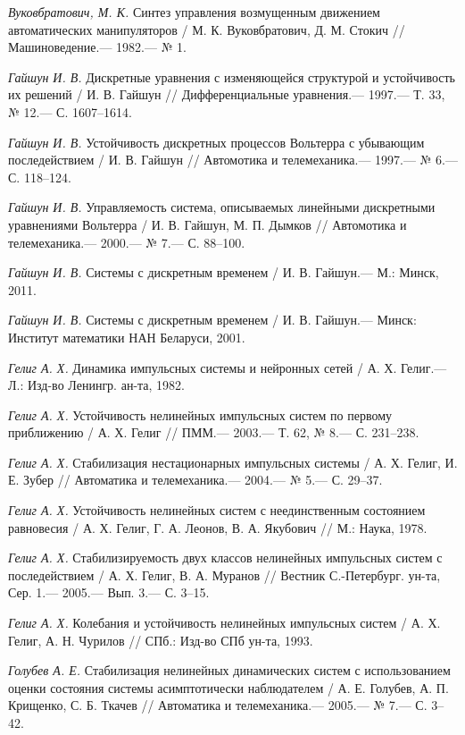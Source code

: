 \begin{thebibliography}{10}
	{\it Вуковбратович, М. К.} Синтез управления возмущенным движением автоматических манипуляторов /
	М. К. Вуковбратович, Д. М. Стокич // Машиноведение.— 1982.— № 1.
	
	{\it Гайшун И. В.} Дискретные уравнения с изменяющейся структурой и устойчивость их решений /
	И. В. Гайшун // Дифференциальные уравнения.— 1997.— Т. 33, № 12.— С. 1607–1614.
	
	{\it Гайшун И. В.} Устойчивость дискретных процессов Вольтерра с убывающим последействием /
	И. В. Гайшун // Автомотика и телемеханика.— 1997.— № 6.— С. 118–124.
	
	{\it Гайшун И. В.} Управляемость система, описываемых линейными дискретными уравнениями Вольтерра /
	И. В. Гайшун, М. П. Дымков // Автомотика и телемеханика.— 2000.— № 7.— С. 88–100.
	
	{\it Гайшун И. В.} Системы с дискретным временем /
	И. В. Гайшун.— М.: Минск, 2011.
	
	
	{\it Гайшун И. В.} Системы с дискретным временем /
	И. В. Гайшун.— Минск: Институт математики НАН Беларуси, 2001.
	
	{\it Гелиг А. Х.} Динамика импульсных системы и нейронных сетей /
	А. Х. Гелиг.— Л.: Изд-во Ленингр. ан-та, 1982.
	
	{\it Гелиг А. Х.} Устойчивость нелинейных импульсных систем по первому приближению /
	А. Х. Гелиг // ПММ.— 2003.— Т. 62, № 8.— С. 231–238.
	
	{\it Гелиг А. Х.} Стабилизация нестационарных импульсных системы /
	А. Х. Гелиг, И. Е. Зубер // Автоматика и телемеханика.— 2004.— № 5.— С. 29–37.
	
	{\it Гелиг А. Х.} Устойчивость нелинейных систем с неединственным состоянием равновесия /
	А. Х. Гелиг, Г. А. Леонов, В. А. Якубович // М.: Наука, 1978.
	
	{\it Гелиг А. Х.} Стабилизируемость двух классов нелинейных импульсных систем с последействием /
	А. Х. Гелиг, В. А. Муранов // Вестник С.-Петербург. ун-та, Сер. 1.— 2005.— Вып. 3.— С. 3–15.
	
	{\it Гелиг А. Х.} Колебания и устойчивость нелинейных импульсных систем /
	А. Х. Гелиг, А. Н. Чурилов // СПб.: Изд-во СПб ун-та, 1993.
	
	{\it Голубев А. Е.} Стабилизация нелинейных динамических систем с использованием оценки состояния системы асимптотически наблюдателем / А. Е. Голубев, А. П. Крищенко, С. Б. Ткачев // Автоматика и телемеханика.— 2005.— № 7.— С. 3–42.
	

\end{thebibliography}
